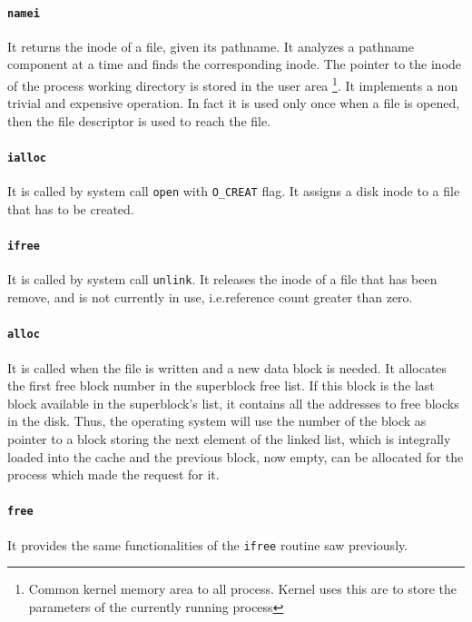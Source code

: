 \paragraph{\texttt{namei}} It returns the inode of a file, given its pathname. It analyzes a pathname component at a time and finds the corresponding inode. The pointer to the inode of the process working directory is stored in the user area \footnote{Common kernel memory area to all process. Kernel uses this are to store the parameters of the currently running process}. It implements a non trivial and expensive operation. In fact it is used only once when a file is opened, then the file descriptor is used to reach the file.

\paragraph{\texttt{ialloc}} It is called by system call \texttt{open} with \texttt{O\_CREAT} flag. It assigns a disk inode to a file that has to be created.

\paragraph{\texttt{ifree}} It is called by system call \texttt{unlink}. It releases the inode of a file that has been remove, and is not currently in use, i.e.\@ reference count greater than zero.

\paragraph{\texttt{alloc}} It is called when the file is written and a new data block is needed. It allocates the first free block number in the superblock free list. If this block is the last block available in the superblock's list, it contains all the addresses to free blocks in the disk. Thus, the operating system will use the number of the block as pointer to a block storing the next element of the linked list, which is integrally loaded into the cache and the previous block, now empty, can be allocated for the process which made the request for it.

\paragraph{\texttt{free}} It provides the same functionalities of the \texttt{ifree} routine saw previously.

